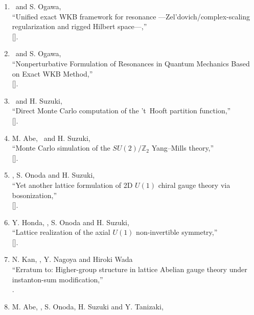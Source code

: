\begin{enumerate}
       .
 \item \OM\ and S. Ogawa,\\
       ``Unified exact WKB framework for resonance ---Zel'dovich/complex-scaling regularization and rigged Hilbert space---,''\\
       [].
 \item \OM\ and S. Ogawa,\\
       ``Nonperturbative Formulation of Resonances in Quantum Mechanics Based on Exact WKB Method,''\\
       [].
 \item \OM\ and H. Suzuki,\\
       ``Direct Monte Carlo computation of the 't~Hooft partition function,''\\
       [].
 \item M. Abe, \OM\ and H. Suzuki,\\
       ``Monte Carlo simulation of the $SU(2)/\mathbb{Z}_2$ Yang--Mills theory,''\\
       [].
 \item \OM, S. Onoda and H. Suzuki,\\
       ``Yet another lattice formulation of 2D $U(1)$ chiral gauge theory via bosonization,''\\
       [].
 \item Y. Honda, \OM, S. Onoda and H. Suzuki,\\
       ``Lattice realization of the axial $U(1)$ non-invertible symmetry,''\\
       [].
 \item N. Kan, \OM, Y. Nagoya and Hiroki Wada\\
       ``Erratum to: Higher-group structure in lattice Abelian gauge theory under instanton-sum modification,''\\
       .
 \item M. Abe, \OM, S. Onoda, H. Suzuki and Y. Tanizaki,\\

\end{enumerate}
